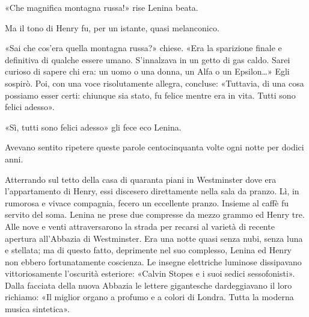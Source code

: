 \documentclass[
a5paper, %
10pt, %
twoside, 
onecolumn, %
openany, %
]{memoir}
\begin{document}
«Che magnifica montagna russa!» rise Lenina beata.

Ma il tono di Henry fu, per un istante, quasi melanconico.

«Sai che cos’era quella montagna russa?» chiese. «Era la sparizione finale e definitiva di qualche essere umano. S’innalzava in un getto di gas caldo. Sarei curioso di sapere chi era: un uomo o una donna, un Alfa o un Epsilon…» Egli sospirò. Poi, con una voce risolutamente allegra, concluse: «Tuttavia, di una cosa possiamo esser certi: chiunque sia stato, fu felice mentre era in vita. Tutti sono felici adesso».

«Sì, tutti sono felici adesso» gli fece eco Lenina.

Avevano sentito ripetere queste parole centocinquanta volte ogni notte per dodici anni.

Atterrando sul tetto della casa di quaranta piani in Westminster dove era l’appartamento di Henry, essi discesero direttamente nella sala da pranzo. Lì, in rumorosa e vivace compagnia, fecero un eccellente pranzo. Insieme al caffè fu servito del soma. Lenina ne prese due compresse da mezzo grammo ed Henry tre. Alle nove e venti attraversarono la strada per recarsi al varietà di recente apertura all’Abbazia di Westminster. Era una notte quasi senza nubi, senza luna e stellata; ma di questo fatto, deprimente nel suo complesso, Lenina ed Henry non ebbero fortunatamente coscienza. Le insegne elettriche luminose dissipavano vittoriosamente l’oscurità esteriore: «Calvin Stopes e i suoi sedici sessofonisti». Dalla facciata della nuova Abbazia le lettere gigantesche dardeggiavano il loro richiamo: «Il miglior organo a profumo e a colori di Londra. Tutta la moderna musica sintetica».
\end{document}
